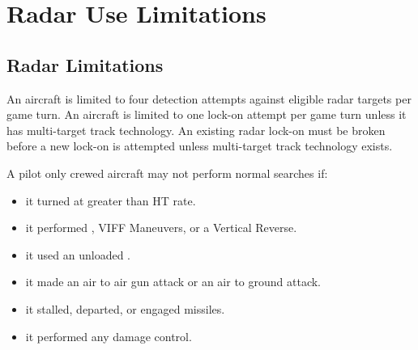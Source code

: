 
\section{Radar Use Limitations}

\subsection{Radar Limitations} An aircraft is limited to four detection attempts against eligible radar targets per game turn. An aircraft is limited to one lock-on attempt per game turn unless it has multi-target track technology. An existing radar lock-on must be broken before a new lock-on is attempted unless multi-target track technology exists.

A pilot only crewed aircraft may not perform normal searches if:

\begin{itemize}

    \item it turned at greater than HT rate.

    \item it performed , VIFF Maneuvers, or a Vertical Reverse.

    \item it used an unloaded .

    \item it made an air to air gun  attack or an air to ground attack.

    \item it stalled, departed, or engaged missiles.


    \item it performed any damage control.


\end{itemize}

